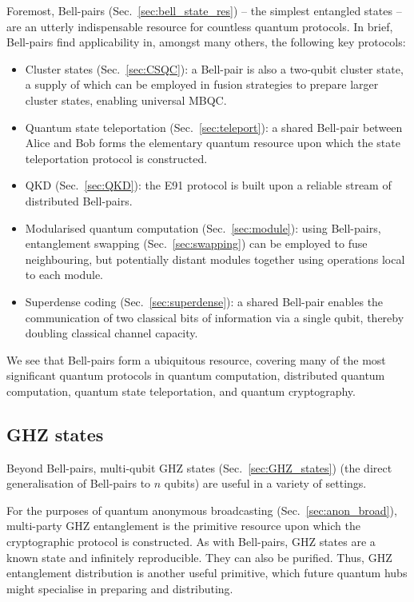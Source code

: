 Foremost, Bell-pairs (Sec.~\ref{sec:bell_state_res}) -- the simplest entangled states -- are an utterly indispensable resource for countless quantum protocols. In brief, Bell-pairs find applicability in, amongst many others, the following key protocols:
\begin{itemize}
\item Cluster states (Sec.~\ref{sec:CSQC}): a Bell-pair is also a two-qubit cluster state, a supply of which can be employed in fusion strategies to prepare larger cluster states, enabling universal MBQC.
\item Quantum state teleportation (Sec.~\ref{sec:teleport}): a shared Bell-pair between Alice and Bob forms the elementary quantum resource upon which the state teleportation protocol is constructed.
\item QKD (Sec.~\ref{sec:QKD}): the E91 protocol is built upon a reliable stream of distributed Bell-pairs.
\item Modularised quantum computation (Sec.~\ref{sec:module}): using Bell-pairs, entanglement swapping (Sec.~\ref{sec:swapping}) can be employed to fuse neighbouring, but potentially distant modules together using operations local to each module.
\item Superdense coding (Sec.~\ref{sec:superdense}): a shared Bell-pair enables the communication of two classical bits of information via a single qubit, thereby doubling classical channel capacity.
\end{itemize}

We see that Bell-pairs form a ubiquitous resource, covering many of the most significant quantum protocols in quantum computation, distributed quantum computation, quantum state teleportation, and quantum cryptography.

%
%

\subsection{GHZ states}

Beyond Bell-pairs, multi-qubit GHZ states (Sec.~\ref{sec:GHZ_states}) (the direct generalisation of Bell-pairs to $n$ qubits) are useful in a variety of settings.

For the purposes of quantum anonymous broadcasting (Sec.~\ref{sec:anon_broad}), multi-party GHZ entanglement is the primitive resource upon which the cryptographic protocol is constructed. As with Bell-pairs, GHZ states are a known state and infinitely reproducible. They can also be purified. Thus, GHZ entanglement distribution is another useful primitive, which future quantum hubs might specialise in preparing and distributing.

